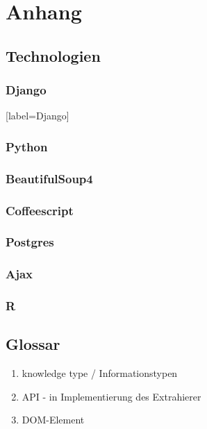 \section{Anhang}
\subsection{Technologien}
\subsubsection{Django}[label=Django]
\subsubsection{Python}
\subsubsection{BeautifulSoup4}
\subsubsection{Coffeescript}
\subsubsection{Postgres}
\subsubsection{Ajax}
\subsubsection{R}

\subsection{Glossar}
\begin{enumerate}
\item knowledge type / Informationstypen
\item API - in Implementierung des Extrahierer
\item DOM-Element

\end{enumerate}
